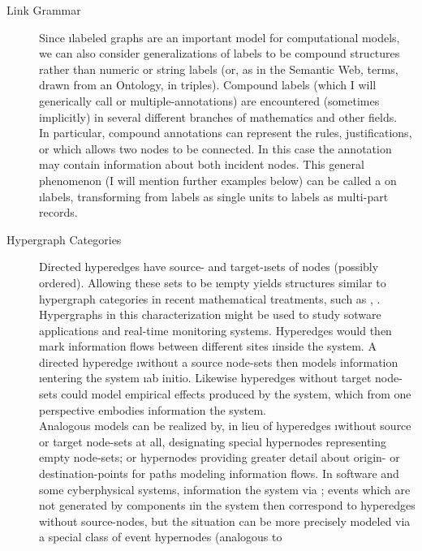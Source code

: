 {\begin{description}
\item[Link Grammar]   Since \i{labeled} 
graphs are an important model for computational models, 
we can also consider generalizations of labels to be 
compound structures rather than numeric or string labels 
(or, as in the Semantic Web,  terms,  
drawn from an Ontology, in  
triples).  Compound labels (which I will generically call 
 or multiple-annotations) are encountered (sometimes implicitly) 
in several different branches of mathematics and other fields.  
\\\hspace*{1em}
In particular, compound annotations can represent the 
rules, justifications, or  which allows 
two nodes to be connected.   In this case the annotation 
may contain information about both incident nodes.  
This general phenomenon (I will mention further examples 
below) can be called a  
on \i{labels}, transforming from labels as single units 
to labels as multi-part records.
\item[Hypergraph Categories]  Directed hyperedges have source- 
and target-\i{sets} of nodes (possibly ordered).  Allowing 
these sets to be \i{empty} yields structures similar to 
hypergraph categories in recent mathematical treatments, such 
as \cite{BrendanFong}, \cite{AleksKissinger}.  Hypergraphs 
in this characterization might be used to study sotware applications 
and real-time monitoring systems.  Hyperedges would then 
mark information flows between different sites \i{inside} the 
system.  A directed hyperedge \i{without} a source node-sets then 
models information \i{entering} the system \i{ab initio}.  
Likewise hyperedges without target node-sets could model 
empirical effects produced by the system, which from one 
perspective embodies information  the system.
\\\hspace*{1em}
Analogous models can be realized by, in lieu of 
hyperedges \i{without} source or target node-sets at all, 
designating special hypernodes representing empty 
node-sets; or hypernodes providing greater detail about 
origin- or destination-points for paths modeling 
information flows.  In software and some cyberphysical 
systems, information  the system via 
; events which are not generated by components \i{in} the 
system then correspond to hyperedges without source-nodes, 
but the situation can be more precisely modeled via a 
special class of event hypernodes (analogous to 

\end{description}}
